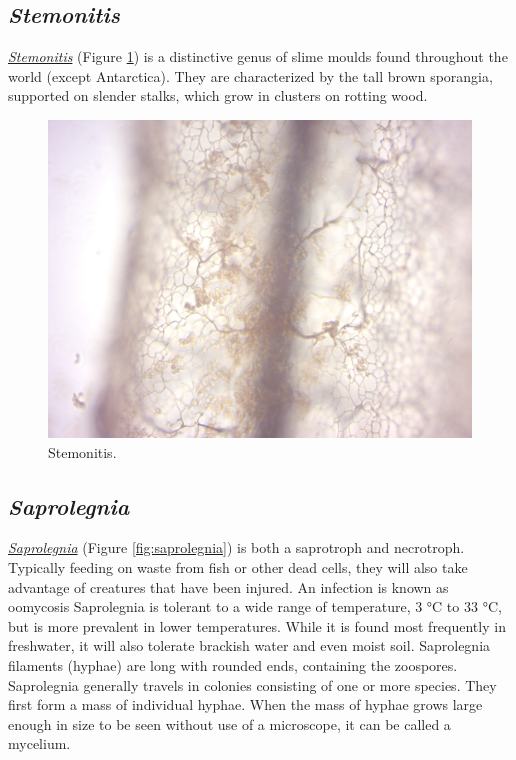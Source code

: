 \subsection{\texorpdfstring{\emph{Stemonitis}}{Stemonitis}}\label{stemonitis}

\href{https://en.wikipedia.org/wiki/Stemonitis}{\emph{Stemonitis}}
(Figure \ref{fig:stemonitis}) is a distinctive genus of slime moulds
found throughout the world (except Antarctica). They are characterized
by the tall brown sporangia, supported on slender stalks, which grow in
clusters on rotting wood.

\begin{figure}

{\centering \includegraphics[width=0.7\linewidth]{./figures/protists/stemonitis} 

}

\caption{Stemonitis.}\label{fig:stemonitis}
\end{figure}

\subsection{\texorpdfstring{\emph{Saprolegnia}}{Saprolegnia}}\label{saprolegnia}

\href{https://en.wikipedia.org/wiki/Saprolegnia}{\emph{Saprolegnia}}
(Figure \ref{fig:saprolegnia}) is both a saprotroph and necrotroph.
Typically feeding on waste from fish or other dead cells, they will also
take advantage of creatures that have been injured. An infection is
known as oomycosis Saprolegnia is tolerant to a wide range of
temperature, 3 °C to 33 °C, but is more prevalent in lower temperatures.
While it is found most frequently in freshwater, it will also tolerate
brackish water and even moist soil. Saprolegnia filaments (hyphae) are
long with rounded ends, containing the zoospores. Saprolegnia generally
travels in colonies consisting of one or more species. They first form a
mass of individual hyphae. When the mass of hyphae grows large enough in
size to be seen without use of a microscope, it can be called a
mycelium.

